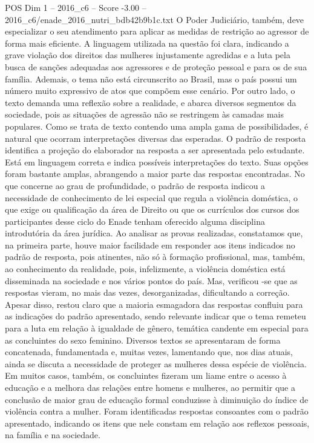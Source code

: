 \begin{textsample}{POS Dim 1 – 2016\_c6 – Score -3.00 – 2016\_c6/enade\_2016\_nutri\_bdb42b9b1c.txt}
O Poder Judiciário, também, deve especializar o seu atendimento para aplicar as medidas de restrição ao agressor de forma mais eficiente.
A linguagem utilizada na questão foi clara, indicando a grave violação dos direitos das mulheres injustamente agredidas e a luta pela busca de sanções adequadas aos agressores e de proteção pessoal e para os de sua família.
Ademais, o tema não está circunscrito ao Brasil, mas o país possui um número muito expressivo de atos que compõem esse cenário.
Por outro lado, o texto demanda uma reflexão sobre a realidade, e abarca diversos segmentos da sociedade, pois as situações de agressão não se restringem às camadas mais populares.
Como se trata de texto contendo uma ampla gama de possibilidades, é natural que ocorram interpretações diversas das esperadas.
O padrão de resposta identifica a projeção do elaborador na resposta a ser apresentada pelo estudante.
Está em linguagem correta e indica possíveis interpretações do texto.
Suas opções foram bastante amplas, abrangendo a maior parte das respostas encontradas.
No que concerne ao grau de profundidade, o padrão de resposta indicou a necessidade de conhecimento de lei especial que regula a violência doméstica, o que exige ou qualificação da área de Direito ou que os currículos dos cursos dos participantes desse ciclo do Enade tenham oferecido alguma disciplina introdutória da área jurídica.
Ao analisar as provas realizadas, constatamos que, na primeira parte, houve maior facilidade em responder aos itens indicados no padrão de resposta, pois atinentes, não só à formação profissional, mas, também, ao conhecimento da realidade, pois, infelizmente, a violência doméstica está disseminada na sociedade e nos vários pontos do país.
Mas, verificou -se que as respostas vieram, no mais das vezes, desorganizadas, dificultando a correção.
Apesar disso, restou claro que a maioria esmagadora das respostas confluiu para as indicações do padrão apresentado, sendo relevante indicar que o tema remeteu para a luta em relação à igualdade de gênero, temática candente em especial para as concluintes do sexo feminino.
Diversos textos se apresentaram de forma concatenada, fundamentada e, muitas vezes, lamentando que, nos dias atuais, ainda se discuta a necessidade de proteger as mulheres dessa espécie de violência.
Em muitos casos, também, os concluintes fizeram um liame entre o acesso à educação e a melhora das relações entre homens e mulheres, ao permitir que a conclusão de maior grau de educação formal conduzisse à diminuição do índice de violência contra a mulher.
Foram identificadas respostas consoantes com o padrão apresentado, indicando os itens que nele constam em relação aos reflexos pessoais, na família e na sociedade.

\end{textsample}
